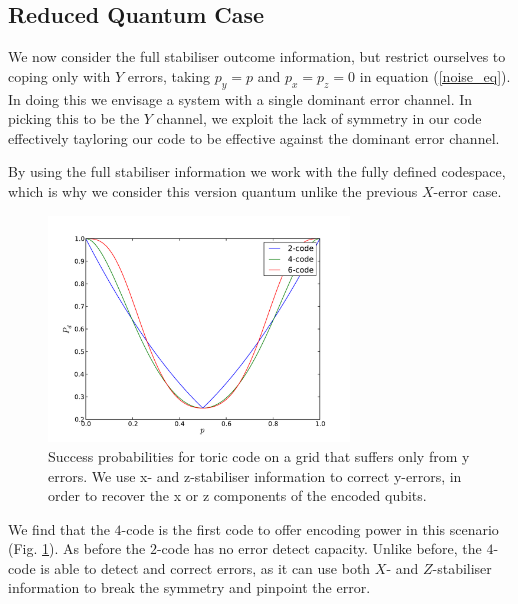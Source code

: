 \subsection{Reduced Quantum Case}


We now consider the full stabiliser outcome information, but restrict ourselves to coping only with $Y$ errors, taking $p_y = p$ and $p_x = p_z = 0$ in equation (\ref{noise_eq}). In doing this we envisage a system with a single dominant error channel. In picking this to be the $Y$ channel, we exploit the lack of symmetry in our code effectively tayloring our code to be effective against the dominant error channel.

By using the full stabiliser information we work with the fully defined codespace, which is why we consider this version quantum unlike the previous $X$-error case.

\begin{figure}[htb]
  \begin{center}
    \includegraphics[width=8cm]{assets/y_truthful.pdf}
  \end{center}
  \caption{Success probabilities for toric code on a grid that suffers only from y errors. We use x- and  z-stabiliser information to correct y-errors, in order to recover the x or z components of the encoded qubits.}
  \label{y_truthful}
\end{figure}

We find that the $4$-code is the first code to offer encoding power in this scenario (Fig. \ref{y_truthful}). As before the $2$-code has no error detect capacity. Unlike before, the $4$-code is able to detect and correct errors, as it can use both $X$- and $Z$-stabiliser information to break the symmetry and pinpoint the error. 

